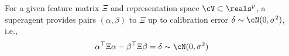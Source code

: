 
\begin{assumption} For a given feature matrix $\Xi$ and representation space $\cV \subset \reals^p$, a superagent provides pairs $(\alpha, \beta)$ to $\Xi$ up to calibration error $\delta \sim \cN(0,\sigma^2)$, i.e.,
    \begin{align*}
        \alpha^{\top}\Xi\alpha - \beta^{\top}\Xi\beta = \delta \sim \cN(0,\sigma^2)
    \end{align*}
\end{assumption}

